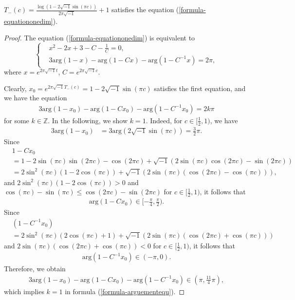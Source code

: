 \documentclass[12pt]{amsart}
\begin{document}
\begin{lemma} \label{lemma-T1(c)iscritical}
$T_-(c)=\frac{\log(1-2\sqrt{-1}\sin(\pi c))}{2\pi\sqrt{-1}}+1$ satisfies the equation (\ref{formula-equationonedim}).
\end{lemma}
\begin{proof}
   The equation (\ref{formula-equationonedim}) is equivalent to 
   \begin{equation} 
\left\{ \begin{aligned}
        &x^2-2x+3-C-\frac{1}{C}=0, \\
                  &3\text{arg}(1-x)-\text{arg}(1-Cx)-\text{arg}(1-C^{-1}x)=2\pi,
                          \end{aligned} \right.
                          \end{equation}
where $x=e^{2\pi\sqrt{-1}t}$, $C=e^{2\pi\sqrt{-1}c}$.

Clearly, $x_0=e^{2\pi\sqrt{-1}T_-(c)}=1-2\sqrt{-1}\sin(\pi c)$ satisfies the first equation, and we have the equation
\begin{align} \label{formula-arguementequ}
    3\text{arg}(1-x_0)-\text{arg}(1-Cx_0)-\text{arg}(1-C^{-1}x_0)=2k\pi
\end{align}
for some $k\in \mathbb{Z}$.  In the following, we show $k=1$. Indeed, for $c\in [\frac{1}{2},1)$, we have
\begin{align}
    3\text{arg}(1-x_0)&=3\text{arg}(2\sqrt{-1}\sin (\pi c))=\frac{3}{2}\pi.
    \end{align}
Since   
    \begin{align}
        &1-Cx_0\\\nonumber
        &=1-2\sin(\pi c)\sin(2\pi c)-\cos(2\pi c)+\sqrt{-1}(2\sin(\pi c)\cos(2\pi c)-\sin(2\pi c))\\\nonumber
    &=2\sin^2(\pi c)(1-2\cos(\pi c))+\sqrt{-1}(2\sin(\pi c)(\cos(2\pi c)-\cos(\pi c))),
    \end{align}
and $2\sin^2(\pi c)(1-2\cos(\pi c))>0$ and $\cos(\pi c)-\sin(\pi c)\leq \cos(2\pi c)-\sin(2\pi c)$ for $c\in [\frac{1}{2},1)$, it follows that 
\begin{align}
\text{arg}(1-Cx_0)\in [-\frac{\pi }{4}, \frac{\pi}{2}).    
\end{align}    
Since    \begin{align}
    &(1-C^{-1}x_0)\\\nonumber
    &=2\sin^2(\pi c)(2\cos(\pi c)+1)+\sqrt{-1}(2\sin(\pi c)(\cos(2\pi c)+\cos(\pi c)))
\end{align}
and $2\sin(\pi c)(\cos(2\pi c)+\cos(\pi c))<0$ for $c\in [\frac{1}{2},1)$, it follows that 
\begin{align}
\text{arg}(1-C^{-1}x_0)\in (-\pi,0).     
\end{align}
Therefore,  we obtain  
\begin{align}
    3\text{arg}(1-x_0)-\text{arg}(1-Cx_0)-\text{arg}(1-C^{-1}x_0)\in (\pi,\frac{11}{4}\pi), 
\end{align}
which implies  $k=1$ in formula (\ref{formula-arguementequ}).  
\end{proof}
\end{document}

